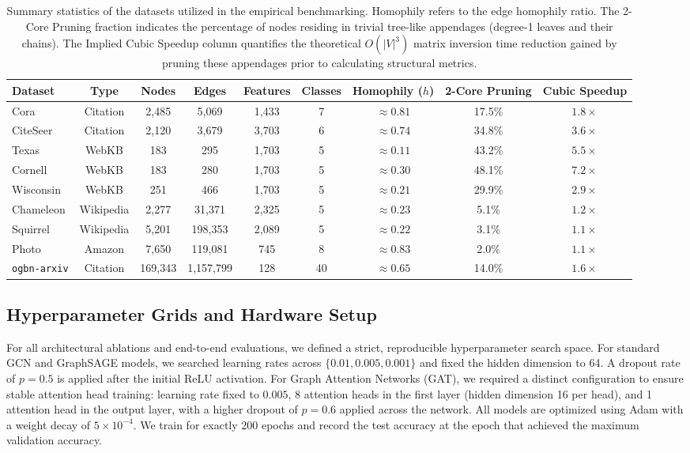 \documentclass[10pt]{article} %
\begin{document}
\begin{table}[h]
\centering
\begin{tabular}{lcccccccc}
\hline
\textbf{Dataset} & \textbf{Type} & \textbf{Nodes} & \textbf{Edges} & \textbf{Features} & \textbf{Classes} & \textbf{Homophily ($h$)} & \textbf{2-Core Pruning} & \textbf{Cubic Speedup} \\
\hline
Cora & Citation & 2,485 & 5,069 & 1,433 & 7 & $\approx 0.81$ & 17.5\% & $1.8\times$ \\
CiteSeer & Citation & 2,120 & 3,679 & 3,703 & 6 & $\approx 0.74$ & 34.8\% & $3.6\times$ \\
Texas & WebKB & 183 & 295 & 1,703 & 5 & $\approx 0.11$ & 43.2\% & $5.5\times$ \\
Cornell & WebKB & 183 & 280 & 1,703 & 5 & $\approx 0.30$ & 48.1\% & $7.2\times$ \\
Wisconsin & WebKB & 251 & 466 & 1,703 & 5 & $\approx 0.21$ & 29.9\% & $2.9\times$ \\
Chameleon & Wikipedia & 2,277 & 31,371 & 2,325 & 5 & $\approx 0.23$ & 5.1\% & $1.2\times$ \\
Squirrel & Wikipedia & 5,201 & 198,353 & 2,089 & 5 & $\approx 0.22$ & 3.1\% & $1.1\times$ \\
Photo & Amazon & 7,650 & 119,081 & 745 & 8 & $\approx 0.83$ & 2.0\% & $1.1\times$ \\
\texttt{ogbn-arxiv} & Citation & 169,343 & 1,157,799 & 128 & 40 & $\approx 0.65$ & 14.0\% & $1.6\times$ \\
\hline
\end{tabular}
\caption{Summary statistics of the datasets utilized in the empirical benchmarking. Homophily refers to the edge homophily ratio. The 2-Core Pruning fraction indicates the percentage of nodes residing in trivial tree-like appendages (degree-1 leaves and their chains). The Implied Cubic Speedup column quantifies the theoretical $O(|V|^3)$ matrix inversion time reduction gained by pruning these appendages prior to calculating structural metrics.}
\label{tab:datasets}
\end{table}

\subsection{Hyperparameter Grids and Hardware Setup}
For all architectural ablations and end-to-end evaluations, we defined a strict, reproducible hyperparameter search space. 
For standard GCN and GraphSAGE models, we searched learning rates across $\{0.01, 0.005, 0.001\}$ and fixed the hidden dimension to 64. A dropout rate of $p=0.5$ is applied after the initial ReLU activation. 
For Graph Attention Networks (GAT), we required a distinct configuration to ensure stable attention head training: learning rate fixed to $0.005$, 8 attention heads in the first layer (hidden dimension 16 per head), and 1 attention head in the output layer, with a higher dropout of $p=0.6$ applied across the network.
All models are optimized using Adam with a weight decay of $5 \times 10^{-4}$. We train for exactly 200 epochs and record the test accuracy at the epoch that achieved the maximum validation accuracy.
\end{document}
